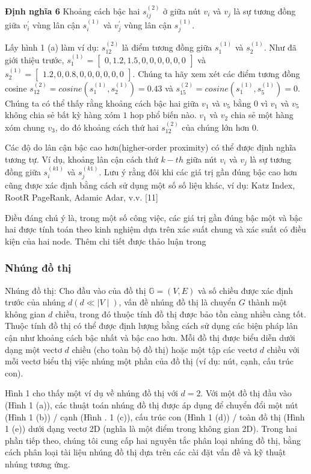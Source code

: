 \textbf{Định nghĩa 6} Khoảng cách bậc hai $s^{(2)}_{ij}$ ở giữa nút $v_i$ và $v_j$ là sự tương đồng giữa $v^{\prime}_i$ vùng lân cận $s^{(1)}_i$ và $v^{\prime}_j$ vùng lân cận $s^{(1)}_j$.


Lấy hình 1 (a) làm ví dụ: $s^{(2)}_{12}$ là điểm tương đồng giữa $s^{(1)}_{1}$ và $s^{(1)}_{2}$. Như đã giới thiệu trước, $s^{(1)}_1 = \begin{bmatrix} 0, 1.2, 1.5, 0, 0, 0, 0, 0, 0 \end{bmatrix}$ và $s^{(1)}_2 = \begin{bmatrix} 1.2, 0, 0.8, 0, 0, 0, 0 , 0, 0 \end{bmatrix}$. Chúng ta hãy xem xét các điểm tương đồng cosine $s^{(2)}_{12} = cosine (s^{(1)}_1, s^{(1)}_2) = 0.43$ và $s^{(2)}_{15} = cosine(s^{(1)}_1, s^{(1)}_5) = 0$. Chúng ta có thể thấy rằng khoảng cách bậc hai giữa $v_1$ và $v_5$ bằng $0$ vì $v_1$ và $v_5$ không chia sẻ bất kỳ hàng xóm $1$ hop phổ biến nào. $v_1$ và $v_2$ chia sẻ một hàng xóm chung $v_3$, do đó khoảng cách thứ hai $s^{(2)}_{12}$ của chúng lớn hơn 0.

Các độ do lân cận bậc cao hơn(higher-order proximity) có thể được định nghĩa tương tự. Ví dụ, khoảng lân cận cách thứ $k-th$ giữa nút $v_i$ và $v_j$ là sự tương đồng giữa $s^{(k 1)}_i$ và $s^{(k 1)}_j$. Lưu ý rằng đôi khi các giá trị gần đúng bậc cao hơn cũng được xác định bằng cách sử dụng một số số liệu khác, ví dụ: Katz Index, RootR PageRank, Adamic Adar, v.v. [11]

Điều đáng chú ý là, trong một số công việc, các giá trị gần đúng bậc một và bậc hai được tính toán theo kinh nghiệm dựa trên xác suất chung và xác suất có điều kiện của hai node. Thêm chi tiết được thảo luận trong

\subsubsection{Nhúng đồ thị}
Nhúng đồ thị: Cho đầu vào của đồ thị \(\mathbb{G} = (V, E)\) và số chiều được xác định trước của nhúng $d (d \ll \mid V \mid)$, vấn đề nhúng đồ thị là chuyển $G$ thành một không gian \(d\) chiều, trong đó thuộc tính đồ thị được bảo tồn càng nhiều càng tốt. Thuộc tính đồ thị có thể được định lượng bằng cách sử dụng các biện pháp lân cận như khoảng cách bậc nhất và bậc cao hơn. Mỗi đồ thị được biểu diễn dưới dạng một vectơ $d$ chiều (cho toàn bộ đồ thị) hoặc một tập các vectơ $d$ chiều với mỗi vectơ biểu thị việc nhúng một phần của đồ thị (ví dụ: nút, cạnh, cấu trúc con).

Hình 1 cho thấy một ví dụ về nhúng đồ thị với $d = 2$. Với một đồ thị đầu vào (Hình 1 (a)), các thuật toán nhúng đồ thị được áp dụng để chuyển đổi một nút (Hình 1 (b)) / cạnh (Hình . 1 (c)), cấu trúc con (Hình 1 (d)) / toàn đồ thị (Hình 1 (e)) dưới dạng vectơ 2D (nghĩa là một điểm trong không gian 2D). Trong hai phần tiếp theo, chúng tôi cung cấp hai nguyên tắc phân loại nhúng đồ thị, bằng cách phân loại tài liệu nhúng đồ thị dựa trên các cài đặt vấn đề và kỹ thuật nhúng tương ứng.

